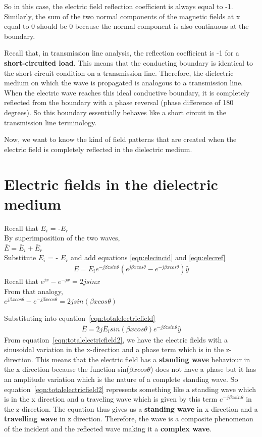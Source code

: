 So in this case, the electric field reflection coefficient is always equal to -1. Similarly, the sum of the two normal components of the
magnetic fields at x equal to 0 should be 0 because the normal component is also continuous at the boundary.
 
Recall that, in transmission line analysis, the reflection coefficient is -1 for a \textbf{short-circuited load}. This means that the conducting boundary is identical to the short circuit condition on a transmission line. Therefore, the dielectric medium on which the wave is propagated is analogous to a transmission line. When the electric wave reaches this ideal conductive boundary, it is completely reflected from the boundary with a phase reversal (phase difference of 180 degrees). So this boundary essentially behaves like a short circuit in the transmission line terminology.

Now, we want to know the kind of field patterns that are created when the electric field is completely reflected in the dielectric medium.
 
\section{Electric fields in the dielectric medium}
Recall that $E_{i}$ = -$E_{r}$\\ 
By superimposition of the two waves,\\ 
$\bar{E}= \bar{E}_i + \bar{E}_r$\\ 
Substitute $E_i$ = - $E_r$ and add equations \eqref{eqn:elecincid} and \eqref{eqn:elecref}
\begin{align}
\bar{E}= \bar{E}_i e^{-j\beta zsin\theta} (e^{j\beta xcos\theta }- e^{-j\beta xcos\theta}) \hat{y}
\label{eqn:totalelectricfield}
\end{align}
Recall that $e^{jx} - e^{-jx} = 2jsinx$\\ 
From that analogy,\\ 
$e^{j\beta xcos\theta} - e^{-j\beta xcos\theta} = 2jsin(\beta xcos\theta)$

Substituting into equation~\ref{eqn:totalelectricfield}
\begin{align}
\bar{E}=2j \bar{E}_i sin(\beta xcos\theta) e^{-j\beta zsin\theta} \hat{y}
\label{eqn:totalelectricfield2}
\end{align}
From equation~\ref{eqn:totalelectricfield2}, we have the electric fields with a sinusoidal variation in the x-direction and a phase term which is in the z-direction. This means that the electric field has a \textbf{standing wave} behaviour in the x direction because the function {sin({$\beta xcos\theta$})} does not have a phase but it has an amplitude variation which is the nature of a complete standing wave. So equation~\ref{eqn:totalelectricfield2} represents something like a standing wave which is in the x direction and a traveling wave which is given by this term \textbf{$e^{-j\beta zsin\theta}$} in the z-direction. The equation thus gives us a \textbf{standing wave} in x direction and a \textbf{travelling wave} in z direction. Therefore, the wave is a composite phenomenon of the incident and the reflected wave making it a \textbf{complex wave}.


